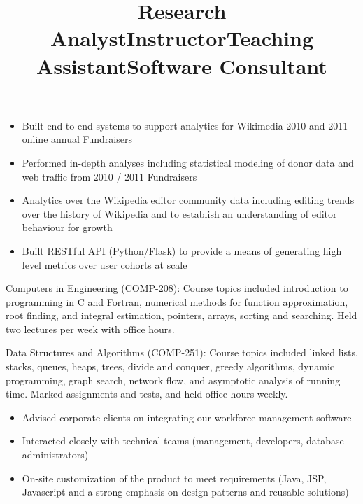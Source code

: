 \begin{resume}
\title{Research Analyst}
\begin{position}
\vspace{-8pt}
\begin{itemize}
  \item  Built end to end systems to support analytics for Wikimedia 2010 and 2011 online annual Fundraisers
  \item  Performed in-depth analyses including statistical modeling of donor data and web traffic from 2010 / 2011 Fundraisers
  \item  Analytics over the Wikipedia editor community data including editing trends over the history of Wikipedia and to establish an understanding of editor behaviour for growth
  \item  Built RESTful API (Python/Flask) to provide a means of generating high level metrics over user cohorts at scale
\end{itemize}
\vspace{4pt}
\end{position}


\title{Instructor}
\begin{position}
Computers in Engineering (COMP-208):  Course topics included introduction to programming in C and Fortran, numerical methods for function approximation, root finding, and integral estimation, pointers, arrays, sorting and searching.  Held two lectures per week with office hours.
\end{position}

\title{Teaching Assistant}
\begin{position}
Data Structures and Algorithms (COMP-251):  Course topics included linked lists, stacks, queues, heaps, trees, divide and conquer, greedy algorithms, dynamic programming, graph search, network flow, and asymptotic analysis of running time.  Marked assignments and tests, and held office hours weekly.
\end{position}

\newpage

\title{Software Consultant}
\begin{position}
\vspace{-8pt}
\begin{itemize}
  \item  Advised corporate clients on integrating our workforce management software
  \item  Interacted closely with technical teams (management, developers, database administrators)
  \item  On-site customization of the product to meet requirements (Java, JSP, Javascript and a strong emphasis on design patterns and reusable solutions)
\end{itemize}
\vspace{4pt}
\end{position}



\end{resume}
